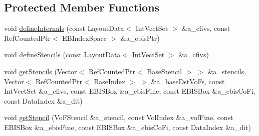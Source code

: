 \subsection*{Protected Member Functions}
\begin{DoxyCompactItemize}
\item 
void \hyperlink{classnwoebquadcfinterp_a4d7ff4af578ff192d0169bd2a398e712}{define\+Internals} (const Layout\+Data$<$ Int\+Vect\+Set $>$ \&a\+\_\+cfivs, const Ref\+Counted\+Ptr$<$ E\+B\+Index\+Space $>$ \&a\+\_\+ebis\+Ptr)
\item 
void \hyperlink{classnwoebquadcfinterp_ad035a7960482fcc092f4a25c6561151d}{define\+Stencils} (const Layout\+Data$<$ Int\+Vect\+Set $>$ \&a\+\_\+cfivs)
\item 
void \hyperlink{classnwoebquadcfinterp_ac4adae5d3819feb3e59508a3a9b32700}{get\+Stencils} (Vector$<$ Ref\+Counted\+Ptr$<$ Base\+Stencil $>$ $>$ \&a\+\_\+stencils, Vector$<$ Ref\+Counted\+Ptr$<$ Base\+Index $>$ $>$ \&a\+\_\+base\+Dst\+Vo\+Fs, const Int\+Vect\+Set \&a\+\_\+cfivs, const E\+B\+I\+S\+Box \&a\+\_\+ebis\+Fine, const E\+B\+I\+S\+Box \&a\+\_\+ebis\+Co\+Fi, const Data\+Index \&a\+\_\+dit)
\item 
void \hyperlink{classnwoebquadcfinterp_a11fe842512397b8d869cfddd5af6398a}{get\+Stencil} (Vo\+F\+Stencil \&a\+\_\+stencil, const Vol\+Index \&a\+\_\+vof\+Fine, const E\+B\+I\+S\+Box \&a\+\_\+ebis\+Fine, const E\+B\+I\+S\+Box \&a\+\_\+ebis\+Co\+Fi, const Data\+Index \&a\+\_\+dit)
\end{DoxyCompactItemize}
